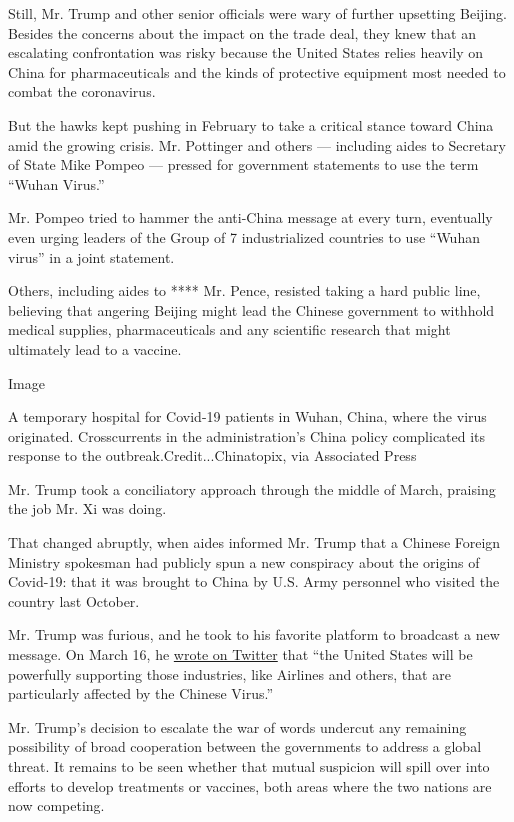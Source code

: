 Still, Mr. Trump and other senior officials were wary of further
upsetting Beijing. Besides the concerns about the impact on the trade
deal, they knew that an escalating confrontation was risky because the
United States relies heavily on China for pharmaceuticals and the kinds
of protective equipment most needed to combat the coronavirus.

But the hawks kept pushing in February to take a critical stance toward
China amid the growing crisis. Mr. Pottinger and others --- including
aides to Secretary of State Mike Pompeo --- pressed for government
statements to use the term ``Wuhan Virus.''

Mr. Pompeo tried to hammer the anti-China message at every turn,
eventually even urging leaders of the Group of 7 industrialized
countries to use ``Wuhan virus'' in a joint statement.

Others, including aides to **** Mr. Pence, resisted taking a hard public
line, believing that angering Beijing might lead the Chinese government
to withhold medical supplies, pharmaceuticals and any scientific
research that might ultimately lead to a vaccine.

Image

A temporary hospital for Covid-19 patients in Wuhan, China, where the
virus originated. Crosscurrents in the administration's China policy
complicated its response to the outbreak.Credit...Chinatopix, via
Associated Press

Mr. Trump took a conciliatory approach through the middle of March,
praising the job Mr. Xi was doing.

That changed abruptly, when aides informed Mr. Trump that a Chinese
Foreign Ministry spokesman had publicly spun a new conspiracy about the
origins of Covid-19: that it was brought to China by U.S. Army personnel
who visited the country last October.

Mr. Trump was furious, and he took to his favorite platform to broadcast
a new message. On March 16, he
\href{https://twitter.com/realDonaldTrump/status/1239685852093169664?ref_src=twsrc\%5Etfw\%7Ctwcamp\%5Etweetembed\%7Ctwterm\%5E1239685852093169664\&ref_url=https\%3A\%2F\%2Fwww.bloomberg.com\%2Fnews\%2Farticles\%2F2020-03-17\%2Ftrump-s-chinese-virus-tweet-adds-fuel-to-fire-with-beijing}{wrote
on Twitter} that ``the United States will be powerfully supporting those
industries, like Airlines and others, that are particularly affected by
the Chinese Virus.''

Mr. Trump's decision to escalate the war of words undercut any remaining
possibility of broad cooperation between the governments to address a
global threat. It remains to be seen whether that mutual suspicion will
spill over into efforts to develop treatments or vaccines, both areas
where the two nations are now competing.

